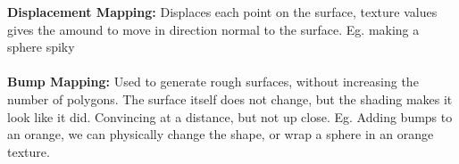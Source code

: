 \documentclass[a4paper,10pt]{article}
\begin{document}
\textcolor{WildStrawberry}{\textbf{Displacement Mapping:}} Displaces each point on the surface, texture values gives the amound to move in direction normal to the surface. Eg. making a sphere spiky\\ \\
\textcolor{WildStrawberry}{\textbf{Bump Mapping:}} Used to generate rough surfaces, without increasing the number of polygons. The surface itself does not change, but the shading makes it look like it did. Convincing at a distance, but not up close. Eg. Adding bumps to an orange, we can physically change the shape, or wrap a sphere in an orange texture. \\ \\
\end{document}
